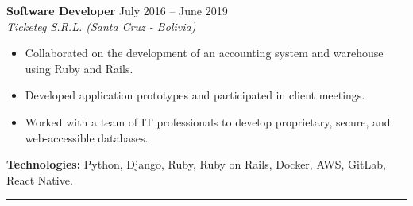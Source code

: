 \textbf{Software Developer} \hfill July 2016 -- June 2019\\
\textit{Ticketeg S.R.L. (Santa Cruz - Bolivia)}\\
\begin{itemize}
    \setlength{\itemsep}{0pt} %
    \setlength{\topsep}{0pt}  %
    \setlength{\parsep}{0pt}  %
    \setlength{\partopsep}{0pt} %
    \item Collaborated on the development of an accounting system and warehouse using Ruby and Rails.
    \item Developed application prototypes and participated in client meetings.
    \item Worked with a team of IT professionals to develop proprietary, secure, and web-accessible databases.
\end{itemize}
\textbf{Technologies:} Python, Django, Ruby, Ruby on Rails, Docker, AWS, GitLab, React Native.
\hrule
\vspace{1em}
